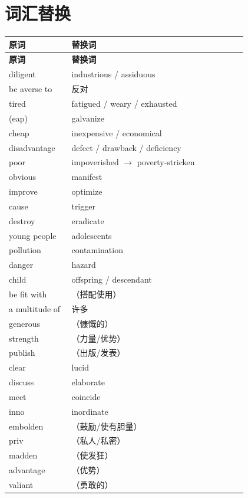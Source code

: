 




\section*{词汇替换}

\begin{longtable}{|>{\raggedright\arraybackslash}p{0.25\linewidth}|>{\raggedright\arraybackslash}p{0.7\linewidth}|}
\hline
\textbf{原词} & \textbf{替换词} \\
\hline
\endfirsthead
\hline
\textbf{原词} & \textbf{替换词} \\
\hline
\endhead
\hline
\endfoot

diligent & industrious / assiduous \\
be averse to & 反对 \\
tired & fatigued / weary / exhausted \\
(eap) & galvanize \\
cheap & inexpensive / economical \\
disadvantage & defect / drawback / deficiency \\
poor & impoverished $\rightarrow$ poverty-stricken \\
obvious & manifest \\
improve & optimize \\
cause & trigger \\
destroy & eradicate \\
young people & adolescents \\
pollution & contamination \\
danger & hazard \\
child & offspring / descendant \\
be fit with & （搭配使用） \\
a multitude of & 许多 \\
generous & （慷慨的） \\
strength & （力量/优势） \\
publish & （出版/发表） \\
clear & lucid \\
discuss & elaborate \\
meet & coincide \\
inno & inordinate \\
embolden & （鼓励/使有胆量） \\
priv & （私人/私密） \\
madden & （使发狂） \\
advantage & （优势） \\
valiant & （勇敢的） \\
\hline
\end{longtable}


